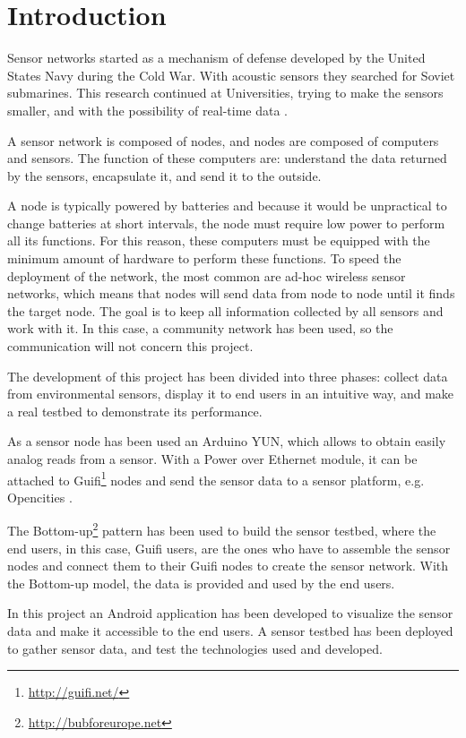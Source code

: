 \documentclass[12pt, a4paper,twoside]{tesi_upf}
\begin{document}
\mainmatter
\chapter{Introduction}
\label{Chapter1}
	
	Sensor networks started as a mechanism of defense developed by the United States Navy during the Cold War. With acoustic sensors they searched for Soviet submarines. This research continued at Universities, trying to make the sensors smaller, and with the possibility of real-time data \cite{chong2003sensor}.
	
	A sensor network is composed of nodes, and nodes are composed of computers and sensors. The function of these computers are: understand the data returned by the sensors, encapsulate it, and send it to the outside.
	
	A node is typically powered by batteries and because it would be unpractical to change batteries at short intervals, the node must require low power to perform all its functions. For this reason, these computers must be equipped with the minimum amount of hardware to perform these functions.
	To speed the deployment of the network, the most common are ad-hoc wireless sensor networks, which means that nodes will send data from node to node until it finds the target node. The goal is to keep all information collected by all sensors and work with it.
	In this case, a community network has been used, so the communication will not concern this project.
	
  The development of this project has been divided into three phases: collect data from environmental sensors, display it to end users in an intuitive way, and make a real testbed to demonstrate its performance.
  
  As a sensor node has been used an Arduino\cite{arduino} YUN, which allows to obtain easily analog reads from a sensor. With a Power over Ethernet module, it can be attached to Guifi\footnote{\url{http://guifi.net/}} nodes and send the sensor data to a sensor platform, e.g. Opencities \cite{opencities}.

  The Bottom-up\footnote{\url{http://bubforeurope.net}} pattern has been used to build the sensor testbed, where the end users, in this case, Guifi users, are the ones who have to assemble the sensor nodes and connect them to their Guifi nodes to create the sensor network. With the Bottom-up model, the data is provided and used by the end users.

  In this project an Android application has been developed to visualize the sensor data and make it accessible to the end users.
  A sensor testbed has been deployed to gather sensor data, and test the technologies used and developed.
  
\end{document}
